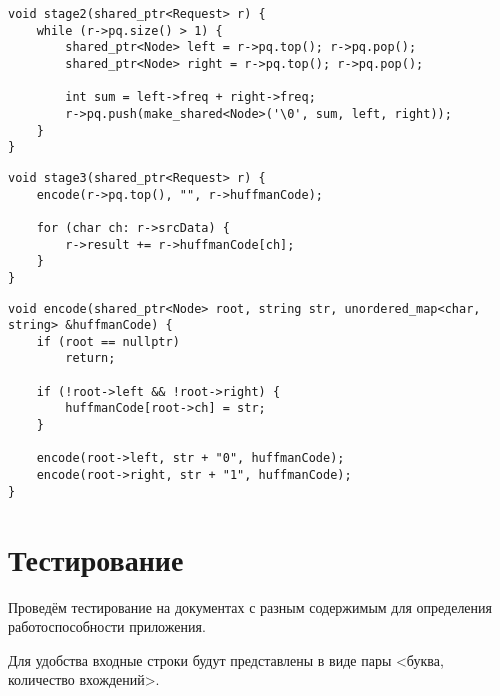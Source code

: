 \begin{lstlisting}[label=lst:stage2,caption=2-й этап алгоритма Хаффмана]
void stage2(shared_ptr<Request> r) {
	while (r->pq.size() > 1) {
		shared_ptr<Node> left = r->pq.top(); r->pq.pop();
		shared_ptr<Node> right = r->pq.top(); r->pq.pop();
		
		int sum = left->freq + right->freq;
		r->pq.push(make_shared<Node>('\0', sum, left, right));
	}
}
\end{lstlisting}

\begin{lstlisting}[label=lst:stage3,caption=3-й этап алгоритма Хаффмана]
void stage3(shared_ptr<Request> r) {
	encode(r->pq.top(), "", r->huffmanCode);
	
	for (char ch: r->srcData) {
		r->result += r->huffmanCode[ch];
	}
}
\end{lstlisting}
\clearpage
\begin{lstlisting}[label=lst:encode,caption=Формирование кодов Хаффмана]
void encode(shared_ptr<Node> root, string str, unordered_map<char, string> &huffmanCode) {
	if (root == nullptr)
		return;
	
	if (!root->left && !root->right) {
		huffmanCode[root->ch] = str;
	}
	
	encode(root->left, str + "0", huffmanCode);
	encode(root->right, str + "1", huffmanCode);
}
\end{lstlisting}

\section{Тестирование}

Проведём тестирование на документах с разным содержимым для 
определения работоспособности приложения.

Для удобства входные строки будут представлены в виде пары <буква, количество вхождений>.

